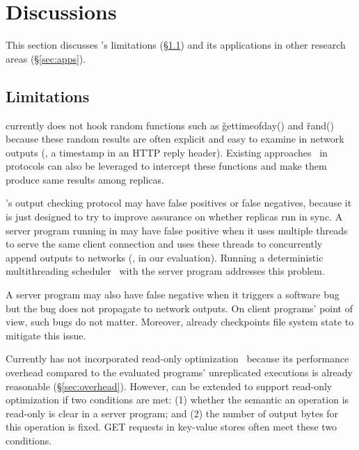 \section{Discussions}\label{sec:discuss}
% 
This section discusses \xxx's limitations (\S\ref{sec:limits}) and its 
applications in other research areas (\S\ref{sec:apps}).

\subsection{Limitations}\label{sec:limits}


\xxx currently does not hook random functions such as \v{gettimeofday()} and 
\v{rand()} because these random results are often explicit and easy to examine 
in network outputs (\eg, a timestamp in an HTTP reply header). Existing 
approaches~\cite{eve:osdi12,paxos:practical} in \paxos protocols can also be 
leveraged to intercept these functions and make them produce same results among 
replicas.


\xxx's output checking protocol may have false positives or false negatives, 
because it is just designed to try to improve assurance on whether replicas run 
in sync. A server program running in \xxx may have false positive when it uses 
multiple threads to serve the same client connection and uses these threads to 
concurrently append outputs to networks (\eg, \clamav in our evaluation). 
Running a deterministic multithreading 
scheduler~\cite{coredet:asplos10,parrot:sosp13} with the server program 
addresses this problem.

A server program may also have false negative when it triggers a software bug 
but the bug does not propagate to network outputs. On client programs' point of 
view, such bugs do not matter. Moreover, \xxx already checkpoints file system 
state to mitigate this issue.

Currently \xxx has not incorporated read-only optimization~\cite{eve:osdi12} 
because its performance overhead compared to the evaluated programs' 
unreplicated executions is already reasonable (\S\ref{sec:overhead}). However, 
\xxx can be extended to support read-only optimization if two conditions are 
met: (1) whether the semantic an operation is read-only is clear in a server 
program; and (2) the number of output bytes for this operation is fixed. GET 
requests in key-value stores often meet these two conditions.

